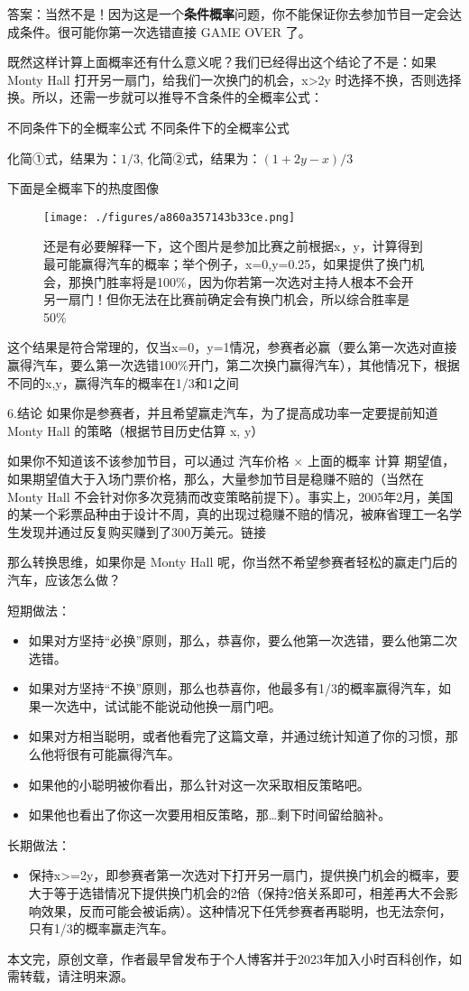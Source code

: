 答案：当然不是！因为这是一个\textbf{条件概率}问题，你不能保证你去参加节目一定会达成条件。很可能你第一次选错直接 GAME OVER 了。

既然这样计算上面概率还有什么意义呢？我们已经得出这个结论了不是：如果 Monty Hall 打开另一扇门，给我们一次换门的机会，x>2y 时选择不换，否则选择换。所以，还需一步就可以推导不含条件的全概率公式：

不同条件下的全概率公式
不同条件下的全概率公式

化简①式，结果为：$1/3$,
化简②式，结果为：$(1+2y-x)/3$

下面是全概率下的热度图像

\begin{figure}[ht]
\centering
\texttt{[image: ./figures/a860a357143b33ce.png]}
\caption{还是有必要解释一下，这个图片是参加比赛之前根据x，y，计算得到最可能赢得汽车的概率；举个例子，x=0,y=0.25，如果提供了换门机会，那换门胜率将是100\%，因为你若第一次选对主持人根本不会开另一扇门！但你无法在比赛前确定会有换门机会，所以综合胜率是50\%} \label{fig_MontyH2}
\end{figure}

这个结果是符合常理的，仅当x=0，y=1情况，参赛者必赢（要么第一次选对直接赢得汽车，要么第一次选错100\%开门，第二次换门赢得汽车），其他情况下，根据不同的x,y，赢得汽车的概率在1/3和1之间

6.结论
如果你是参赛者，并且希望赢走汽车，为了提高成功率一定要提前知道 Monty Hall 的策略（根据节目历史估算 x, y）

如果你不知道该不该参加节目，可以通过 汽车价格 × 上面的概率 计算 期望值，如果期望值大于入场门票价格，那么，大量参加节目是稳赚不赔的（当然在 Monty Hall 不会针对你多次竞猜而改变策略前提下）。事实上，2005年2月，美国的某一个彩票品种由于设计不周，真的出现过稳赚不赔的情况，被麻省理工一名学生发现并通过反复购买赚到了300万美元。链接

那么转换思维，如果你是 Monty Hall 呢，你当然不希望参赛者轻松的赢走门后的汽车，应该怎么做？

短期做法：

\begin{itemize}
\item 如果对方坚持“必换”原则，那么，恭喜你，要么他第一次选错，要么他第二次选错。
\item 如果对方坚持“不换”原则，那么也恭喜你，他最多有1/3的概率赢得汽车，如果一次选中，试试能不能说动他换一扇门吧。
\item 如果对方相当聪明，或者他看完了这篇文章，并通过统计知道了你的习惯，那么他将很有可能赢得汽车。
\item 如果他的小聪明被你看出，那么针对这一次采取相反策略吧。
\item 如果他也看出了你这一次要用相反策略，那…剩下时间留给脑补。
\end{itemize}

长期做法：

\begin{itemize}
\item 保持x>=2y，即参赛者第一次选对下打开另一扇门，提供换门机会的概率，要大于等于选错情况下提供换门机会的2倍（保持2倍关系即可，相差再大不会影响效果，反而可能会被诟病）。这种情况下任凭参赛者再聪明，也无法奈何，只有1/3的概率赢走汽车。
\end{itemize}

本文完，原创文章，作者最早曾发布于个人博客并于2023年加入小时百科创作，如需转载，请注明来源。

